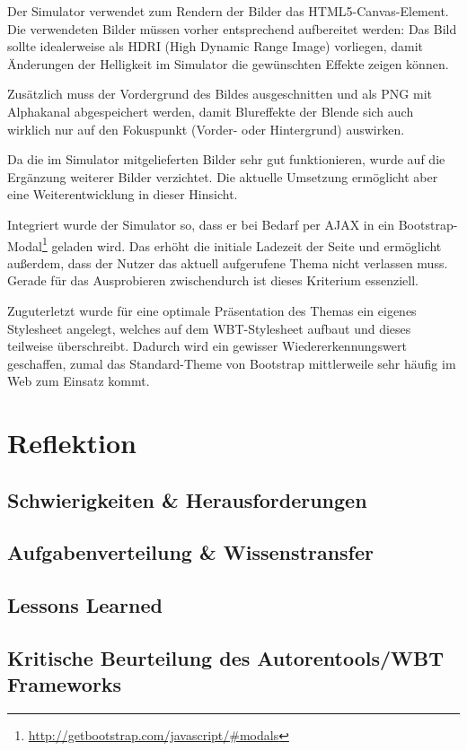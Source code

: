 \documentclass{article}
\begin{document}
Der Simulator verwendet zum Rendern der Bilder das HTML5-Canvas-Element. 
Die verwendeten Bilder m\"ussen vorher entsprechend aufbereitet werden: Das Bild sollte idealerweise als HDRI (High Dynamic Range Image) vorliegen, damit \"Anderungen der Helligkeit im Simulator die gew\"unschten Effekte zeigen k\"onnen. 

Zus\"atzlich muss der Vordergrund des Bildes ausgeschnitten und als PNG mit Alphakanal abgespeichert werden, damit Blureffekte der Blende sich auch wirklich nur auf den Fokuspunkt (Vorder- oder Hintergrund) auswirken.

Da die im Simulator mitgelieferten Bilder sehr gut funktionieren, wurde auf die Erg\"anzung weiterer Bilder verzichtet. Die aktuelle Umsetzung erm\"oglicht aber eine Weiterentwicklung in dieser Hinsicht.

Integriert wurde der Simulator so, dass er bei Bedarf per AJAX in ein Bootstrap-Modal\footnote{\url{http://getbootstrap.com/javascript/\#modals}} geladen wird. Das erh\"oht die initiale Ladezeit der Seite und erm\"oglicht au{\ss}erdem, dass der Nutzer das aktuell aufgerufene Thema nicht verlassen muss. Gerade f\"ur das Ausprobieren zwischendurch ist dieses Kriterium essenziell.

Zuguterletzt wurde f\"ur eine optimale Pr\"asentation des Themas ein eigenes Stylesheet angelegt, welches auf dem WBT-Stylesheet aufbaut und dieses teilweise \"uberschreibt. Dadurch wird ein gewisser Wiedererkennungswert geschaffen, zumal das Standard-Theme von Bootstrap mittlerweile sehr h\"aufig im Web zum Einsatz kommt. 

\section{Reflektion}
\label{sec:reflektion}

\subsection{Schwierigkeiten \& Herausforderungen}


\subsection{Aufgabenverteilung \& Wissenstransfer}


\subsection{Lessons Learned}

\subsection{Kritische Beurteilung des Autorentools/WBT Frameworks}


%
\vfill
\pagebreak


\end{document}
